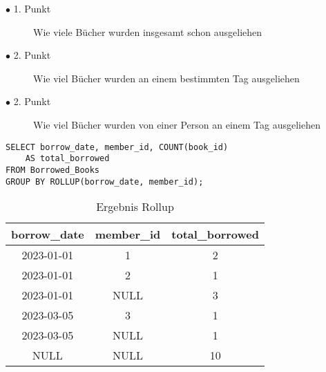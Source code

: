 \begin{description}
	\label{bul:aufzählung}

	\item[$\bullet$ 1. Punkt] Wie viele Bücher wurden insgesamt schon ausgeliehen

	\item[$\bullet$ 2. Punkt] Wie viel Bücher wurden an einem bestimmten Tag ausgeliehen

	\item[$\bullet$ 2. Punkt] Wie viel Bücher wurden von einer Person an einem Tag
		ausgeliehen
\end{description}

\begin{lstlisting}[caption={Beispiel eines ROLLUP}, label={list:rollup}]
SELECT borrow_date, member_id, COUNT(book_id)
	AS total_borrowed
FROM Borrowed_Books
GROUP BY ROLLUP(borrow_date, member_id);
\end{lstlisting}

\begin{table}[h]
	\centering
	\begin{tabular}{|c|c|c|}
		\hline
		\textbf{borrow\_date} & \textbf{member\_id} & \textbf{total\_borrowed} \\
		\hline
		2023-01-01            & 1                   & 2                        \\ %
		\hline
		2023-01-01            & 2                   & 1                        \\ %
		\hline
		2023-01-01            & NULL                & 3                        \\ %
		\hline
		2023-03-05            & 3                   & 1                        \\
		\hline
		2023-03-05            & NULL                & 1                        \\
		\hline
		NULL                  & NULL                & 10                       \\
		\hline
	\end{tabular}
	\caption{Ergebnis Rollup}
	\label{tab:rollup}
\end{table}

